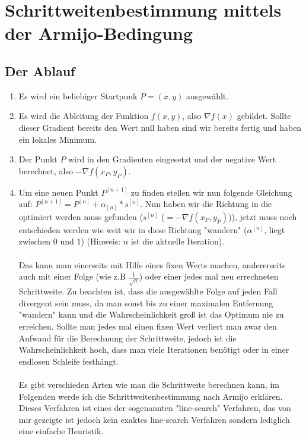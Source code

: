 \documentclass[a4paper, 11pt]{article}
\begin{document}
\section{Schrittweitenbestimmung mittels der Armijo-Bedingung}
\subsection{Der Ablauf}

\begin{enumerate}
      \item 
      Es wird ein beliebiger Startpunk $P=(x,y)$ ausgewählt.
      \item 
      Es wird die Ableitung der Funktion $f(x,y)$, also ${\nabla}f(x)$ gebildet. Sollte dieser Gradient bereits den Wert null haben sind wir bereits fertig und haben ein lokales Minimum.
      \item 
      Der Punkt $P$ wird in den Gradienten eingesetzt und der negative Wert berechnet, also $-{\nabla}f(x_{P},y_{P})$.
      \item
      Um eine neuen Punkt $P^{[n+1]}$ zu finden stellen wir nun folgende Gleichung auf: $P^{[n+1]} = P^{[n]} + \alpha_{[n]} * s^{[n]}$. Nun haben wir die Richtung in die optimiert werden muss gefunden ($s^{[n]}$ ($=-{\nabla}f(x_{P},y_{P})$)), jetzt muss noch entschieden werden wie weit wir in diese Richtung "wandern" ($\alpha^{[n]}$, liegt zwischen $0$ und $1$) (Hinweis: $n$ ist die aktuelle Iteration). \\\\
      Das kann man einerseits mit Hilfe eines fixen Werts machen, andererseits auch mit einer Folge (wie z.B $\frac{1}{\sqrt{n}}$) oder einer jedes mal neu errechneten Schrittweite. Zu beachten ist, dass die ausgewählte Folge auf jeden Fall divergent sein muss, da man sonst bis zu einer maximalen Entfernung "wandern" kann und die Wahrscheinlichkeit groß ist das Optimum nie zu erreichen. Sollte man jedes mal einen fixen Wert verliert man zwar den Aufwand für die Berechnung der  Schrittweite, jedoch ist die Wahrscheinlichkeit hoch, dass man viele Iterationen benötigt oder in einer endlosen Schleife festhängt. \\\\
      Es gibt verschieden Arten wie man die Schrittweite berechnen kann, im Folgenden werde ich die Schrittweitenbestimmung nach Armijo erklären. Dieses Verfahren ist eines der sogenannten "line-search" Verfahren, das von mir gezeigte ist jedoch kein exaktes line-search Verfahren sondern lediglich eine einfache Heuristik. \\\\

\end{enumerate}
\end{document}
